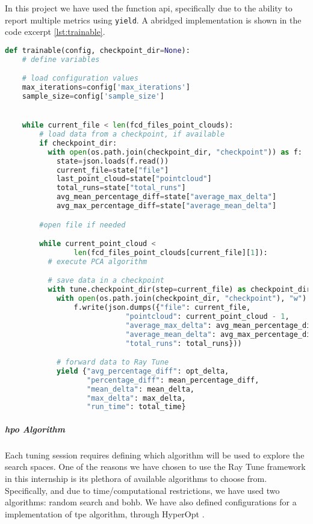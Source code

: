 In this project we have used the function \acrshort{api}, specifically due to the ability to report multiple metrics using \verb!yield!. A abridged implementation is shown in the code excerpt \ref{lst:trainable}.

\begin{lstlisting}[language=Python, caption=Abridged Trainable function, captionpos=b, label={lst:trainable}]
def trainable(config, checkpoint_dir=None):
    # define variables

    # load configuration values
    max_iterations=config['max_iterations']
    sample_size=config['sample_size']


    while current_file < len(fcd_files_point_clouds):
        # load data from a checkpoint, if available 
        if checkpoint_dir:
          with open(os.path.join(checkpoint_dir, "checkpoint")) as f:
            state=json.loads(f.read())
            current_file=state["file"]
            last_point_cloud=state["pointcloud"]
            total_runs=state["total_runs"]
            avg_mean_percentage_diff=state["average_max_delta"]
            avg_max_percentage_diff=state["average_mean_delta"]

        #open file if needed

        while current_point_cloud < 
                len(fcd_files_point_clouds[current_file][1]):
          # execute PCA algorithm

          # save data in a checkpoint
          with tune.checkpoint_dir(step=current_file) as checkpoint_dir:
            with open(os.path.join(checkpoint_dir, "checkpoint"), "w") as f:
                f.write(json.dumps({"file": current_file,
                            "pointcloud": current_point_cloud - 1,
                            "average_max_delta": avg_mean_percentage_diff,
                            "average_mean_delta": avg_max_percentage_diff,
                            "total_runs": total_runs}))

            # forward data to Ray Tune
            yield {"avg_percentage_diff": opt_delta,
                   "percentage_diff": mean_percentage_diff,
                   "mean_delta": mean_delta,
                   "max_delta": max_delta,
                   "run_time": total_time}
\end{lstlisting}

\subparagraph{\acrshort{hpo} Algorithm}

Each tuning session requires defining which algorithm will be used to explore the search spaces. One of the reasons we have chosen to use the Ray Tune framework in this internship is its plethora of available algorithms to choose from. Specifically, and due to time/computational restrictions, we have used two algorithms: random search and \acrshort{bohb}. We have also defined configurations for a implementation of \acrshort{tpe} algorithm, through HyperOpt \parencite{10.5555/3042817.3042832}.

